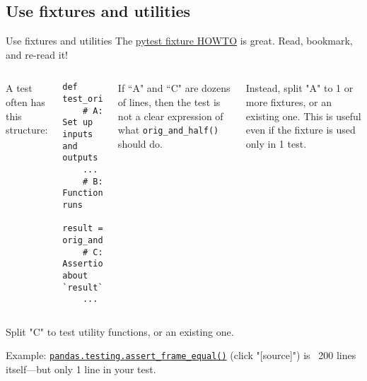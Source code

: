 \documentclass[12pt,aspectratio=169]{beamer}
\begin{document}
\subsection{Use fixtures and utilities}
\begin{frame}[fragile]{Use fixtures and utilities}
The \href{https://docs.pytest.org/en/stable/how-to/fixtures.html}{pytest fixture HOWTO} is great.
Read, bookmark, and re-read it!

\medskip
\begin{columns}[T]
\column{0.45\paperwidth}
A test often has this structure:

\medskip
\begin{verbatim}
def test_orig_and_half():
    # A: Set up inputs and outputs
    ...
    # B: Function runs
    result = orig_and_half(input)
    # C: Assertions about `result`
    ...
\end{verbatim}

\column{0.45\paperwidth}
If “A" and “C" are dozens of lines, then the test is not a clear expression of what \texttt{orig_and_half()} should do.

\medskip
Instead, split "A" to 1 or more fixtures, or  an existing one.
This is useful even if the fixture is used only in 1 test.
\end{columns}

\medskip
Split "C" to test utility functions, or  an existing one.

\medskip
Example: \href{https://pandas.pydata.org/pandas-docs/stable/reference/api/pandas.testing.assert_frame_equal.html}{\texttt{pandas.testing.assert_frame_equal()}} (click "[source]") is ~200 lines itself—but only 1 line in your test.
\end{frame}
\end{document}
